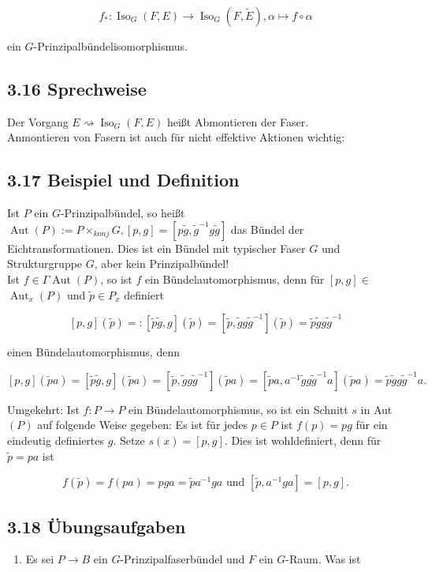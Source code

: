 \documentclass[10pt, letterpaper]{article}
\begin{document}
$$
f_{*}: \operatorname{Iso}_{G}(F, E) \rightarrow \operatorname{Iso}_{G}(F, \tilde{E}), \alpha \mapsto f \circ \alpha
$$

ein $G$-Prinzipalbündelisomorphismus.

\subsection*{3.16 Sprechweise}
Der Vorgang $E \rightsquigarrow \operatorname{Iso}_{G}(F, E)$ heißt Abmontieren der Faser.\\
Anmontieren von Fasern ist auch für nicht effektive Aktionen wichtig:

\subsection*{3.17 Beispiel und Definition}
Ist $P$ ein $G$-Prinzipalbündel, so heißt $\operatorname{Aut}(P):=P \times_{k o n j} G,[p, g]=\left[p \tilde{g}, \tilde{g}^{-1} g \tilde{g}\right]$ das Bündel der Eichtransformationen. Dies ist ein Bündel mit typischer Faser $G$ und Strukturgruppe $G$, aber kein Prinzipalbündel!\\
Ist $f \in \Gamma \operatorname{Aut}(P)$, so ist $f$ ein Bündelautomorphismus, denn für $[p, g] \in$ $\operatorname{Aut}_{x}(P)$ und $\tilde{p} \in P_{x}$ definiert

$$
[p, g](\tilde{p})=:[\tilde{p} \tilde{g}, g](\tilde{p})=\left[\tilde{p}, \tilde{g} g \tilde{g}^{-1}\right](\tilde{p})=\tilde{p} \tilde{g} g \tilde{g}^{-1}
$$

einen Bündelautomorphismus, denn

$$
[p, g](\tilde{p} a)=[\tilde{p} \tilde{g}, g](\tilde{p} a)=\left[\tilde{p}, \tilde{g} g \tilde{g}^{-1}\right](\tilde{p} a)=\left[\tilde{p} a, a^{-1} \tilde{g} g \tilde{g}^{-1} a\right](\tilde{p} a)=\tilde{p} \tilde{g} g \tilde{g}^{-1} a .
$$

Umgekehrt: Ist $f: P \rightarrow P$ ein Bündelautomorphismus, so ist ein Schnitt $s$ in Aut $(P)$ auf folgende Weise gegeben: Es ist für jedes $p \in P$ ist $f(p)=p g$ für ein eindeutig definiertes $g$. Setze $s(x)=[p, g]$. Dies ist wohldefiniert, denn für $\tilde{p}=p a$ ist

$$
f(\tilde{p})=f(p a)=p g a=\tilde{p} a^{-1} g a \text { und }\left[\tilde{p}, a^{-1} g a\right]=[p, g] .
$$

\subsection*{3.18 Übungsaufgaben}
\begin{enumerate}
  \item Es sei $P \rightarrow B$ ein $G$-Prinzipalfaserbündel und $F$ ein $G$-Raum. Was ist
\end{enumerate}
\end{document}
